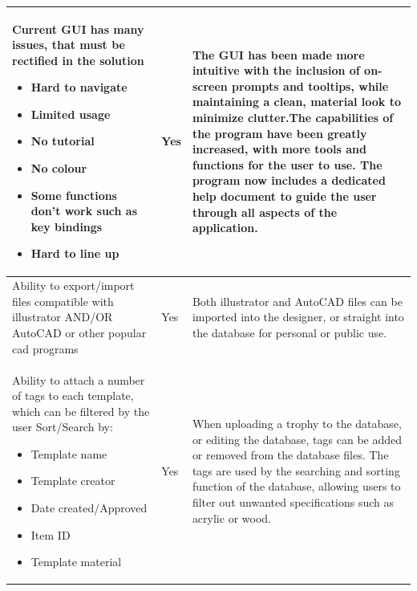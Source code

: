 \documentclass[oneside,openany,11pt,a4paper]{report}
\begin{document}
\begin{longtable}{|p{4cm}|p{2cm}|p{8cm}|}
	Current GUI has many issues, that must be rectified in the solution
	\begin{itemize}
		\itemsep0em
		\item Hard to navigate
		\item Limited usage
		\item No tutorial
		\item No colour
		\item Some functions don’t work such as key bindings
		\item Hard to line up
	\end{itemize} & 
	Yes &
	The GUI has been made more intuitive with the inclusion of on-screen prompts and tooltips, while maintaining a clean, material look to minimize clutter.\newline The capabilities of the program have been greatly increased, with more tools and functions for the user to use. The program now includes a dedicated help document to guide the user through all aspects of the application.
	\\ \hline
	Ability to export/import files compatible with illustrator AND/OR AutoCAD or other popular cad programs &
	Yes &
	Both illustrator and AutoCAD files can be imported into the designer, or straight into the database for personal or public use.
	\\ \hline
	
	Ability to attach a number of tags to each template, which can be filtered by the user
	Sort/Search by:
		\begin{itemize}
		\itemsep0em
		\item Template name
		\item Template creator
		\item Date created/Approved
		\item Item ID
		\item Template material
	\end{itemize} & 
	Yes &
	When uploading a trophy to the database, or editing the database, tags can be added or removed from the database files. The tags are used by the searching and sorting function of the database, allowing users to filter out unwanted specifications such as acrylic or wood.
	\\ \hline
	

\end{longtable}
\end{document}
